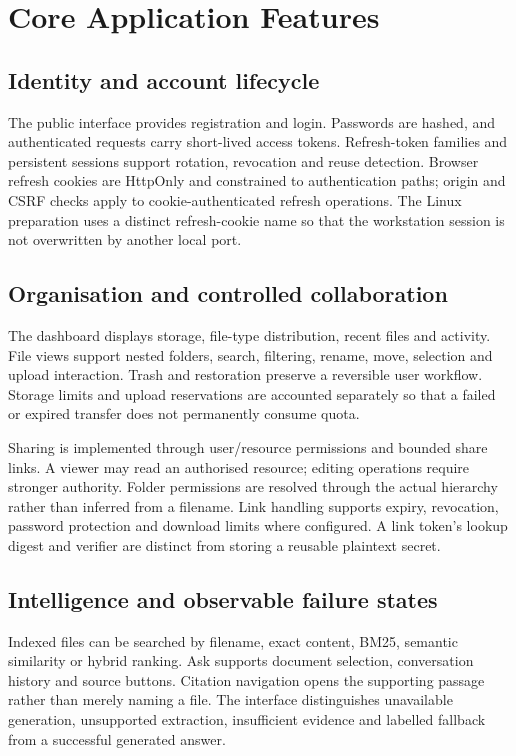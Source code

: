 \chapter{Core Application Features}
\section{Identity and account lifecycle}
The public interface provides registration and login. Passwords are hashed, and authenticated requests carry short-lived access tokens. Refresh-token families and persistent sessions support rotation, revocation and reuse detection. Browser refresh cookies are HttpOnly and constrained to authentication paths; origin and CSRF checks apply to cookie-authenticated refresh operations. The Linux preparation uses a distinct refresh-cookie name so that the workstation session is not overwritten by another local port.
\section{Organisation and controlled collaboration}
The dashboard displays storage, file-type distribution, recent files and activity. File views support nested folders, search, filtering, rename, move, selection and upload interaction. Trash and restoration preserve a reversible user workflow. Storage limits and upload reservations are accounted separately so that a failed or expired transfer does not permanently consume quota.

Sharing is implemented through user/resource permissions and bounded share links. A viewer may read an authorised resource; editing operations require stronger authority. Folder permissions are resolved through the actual hierarchy rather than inferred from a filename. Link handling supports expiry, revocation, password protection and download limits where configured. A link token's lookup digest and verifier are distinct from storing a reusable plaintext secret.
\section{Intelligence and observable failure states}
Indexed files can be searched by filename, exact content, BM25, semantic similarity or hybrid ranking. Ask supports document selection, conversation history and source buttons. Citation navigation opens the supporting passage rather than merely naming a file. The interface distinguishes unavailable generation, unsupported extraction, insufficient evidence and labelled fallback from a successful generated answer.

